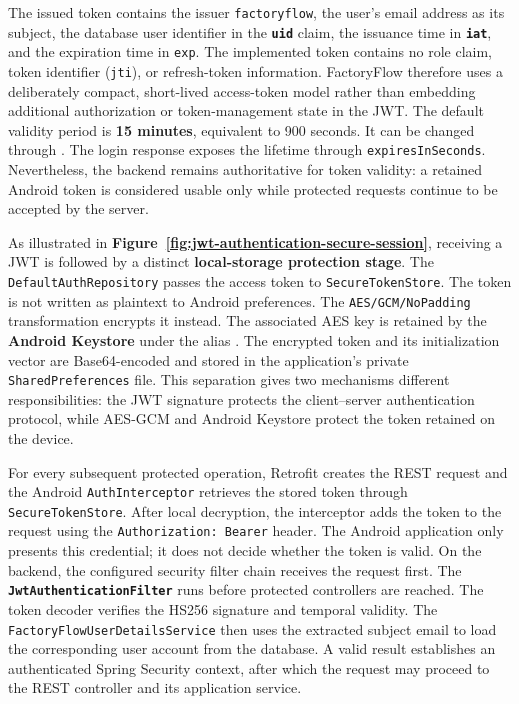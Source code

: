 The issued token contains the issuer \texttt{factoryflow}, the user's email address as its subject, the database user identifier in the \textbf{\texttt{uid}} claim, the issuance time in \textbf{\texttt{iat}}, and the expiration time in \texttt{exp}. The implemented token contains no role claim, token identifier (\texttt{jti}), or refresh-token information. FactoryFlow therefore uses a deliberately compact, short-lived access-token model rather than embedding additional authorization or token-management state in the JWT. The default validity period is \textbf{15 minutes}, equivalent to 900 seconds. It can be changed through . The login response exposes the lifetime through \texttt{expiresInSeconds}. Nevertheless, the backend remains authoritative for token validity: a retained Android token is considered usable only while protected requests continue to be accepted by the server.

As illustrated in \textbf{Figure~\ref{fig:jwt-authentication-secure-session}}, receiving a JWT is followed by a distinct \textbf{local-storage protection stage}. The \texttt{DefaultAuthRepository} passes the access token to \texttt{SecureTokenStore}. The token is not written as plaintext to Android preferences. The \texttt{AES/GCM/NoPadding} transformation encrypts it instead. The associated AES key is retained by the \textbf{Android Keystore} under the alias . The encrypted token and its initialization vector are Base64-encoded and stored in the application's private  \texttt{SharedPreferences} file. This separation gives two mechanisms different responsibilities: the JWT signature protects the client--server authentication protocol, while AES-GCM and Android Keystore protect the token retained on the device.

For every subsequent protected operation, Retrofit creates the REST request and the Android \texttt{AuthInterceptor} retrieves the stored token through \texttt{SecureTokenStore}. After local decryption, the interceptor adds the token to the request using the \texttt{Authorization: Bearer} header. The Android application only presents this credential; it does not decide whether the token is valid. On the backend, the configured security filter chain receives the request first. The \textbf{\texttt{JwtAuthenticationFilter}} runs before protected controllers are reached. The token decoder verifies the HS256 signature and temporal validity. The \texttt{FactoryFlowUserDetailsService} then uses the extracted subject email to load the corresponding user account from the database. A valid result establishes an authenticated Spring Security context, after which the request may proceed to the REST controller and its application service.

